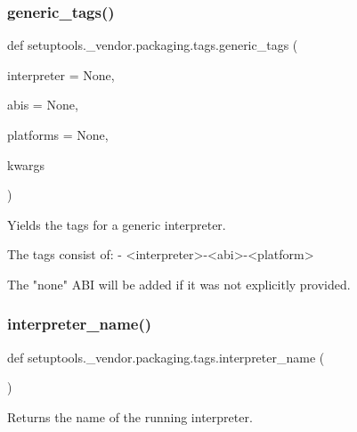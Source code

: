 \subsubsection{\texorpdfstring{generic\+\_\+tags()}{generic\_tags()}}
{\footnotesize\ttfamily def setuptools.\+\_\+vendor.\+packaging.\+tags.\+generic\+\_\+tags (\begin{DoxyParamCaption}\item[{}]{interpreter = {\ttfamily None},  }\item[{}]{abis = {\ttfamily None},  }\item[{}]{platforms = {\ttfamily None},  }\item[{}]{kwargs }\end{DoxyParamCaption})}

\begin{DoxyVerb}Yields the tags for a generic interpreter.

The tags consist of:
- <interpreter>-<abi>-<platform>

The "none" ABI will be added if it was not explicitly provided.
\end{DoxyVerb}
 \mbox{\label{namespacesetuptools_1_1__vendor_1_1packaging_1_1tags_ace3aebeb4d284b3ceccc848edfdfdeb5}} 
\subsubsection{\texorpdfstring{interpreter\+\_\+name()}{interpreter\_name()}}
{\footnotesize\ttfamily def setuptools.\+\_\+vendor.\+packaging.\+tags.\+interpreter\+\_\+name (\begin{DoxyParamCaption}{ }\end{DoxyParamCaption})}

\begin{DoxyVerb}Returns the name of the running interpreter.
\end{DoxyVerb}
 \mbox{\label{namespacesetuptools_1_1__vendor_1_1packaging_1_1tags_aef68f7c5a1182234b81fa9d4f5c48c35}} 
